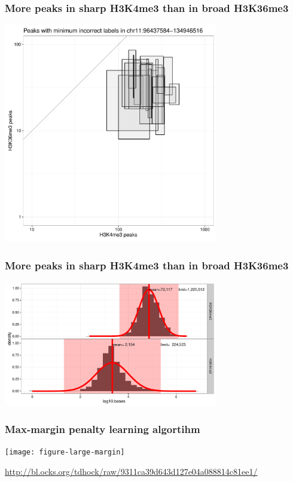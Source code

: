 \documentclass{beamer}
\begin{document}
\begin{frame}
  \frametitle{More peaks in sharp H3K4me3 than in broad H3K36me3}
  \includegraphics[width=0.7\textwidth]{figure-min-err-peaks-compare}
\end{frame}

\begin{frame}
  \frametitle{More peaks in sharp H3K4me3 than in broad H3K36me3}
  \includegraphics[width=0.7\textwidth]{figure-peak-size-model}
\end{frame}

\begin{frame}
  \frametitle{Max-margin penalty learning algortihm}
  \texttt{[image: figure-large-margin]}
 
\scriptsize \url{http://bl.ocks.org/tdhock/raw/9311ca39d643d127e04a088814c81ee1/}

\end{frame}

\end{document}
